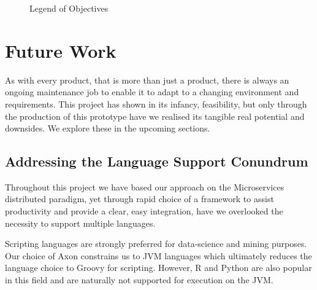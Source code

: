 \begin{figure}[h!]
	\small
	\printGoals
	\caption{Legend of Objectives}
\end{figure}





\section{Future Work}

As with every product, that is more than just a product, there is always an ongoing maintenance job to enable it to adapt to a changing environment and requirements. This project has shown in its infancy, feasibility, but only through the production of this prototype have we realised its tangible real potential and downsides. We explore these in the upcoming sections.

\subsection{Addressing the Language Support Conundrum}

Throughout this project we have based our approach on the Microservices distributed paradigm, yet through rapid choice of a framework to assist productivity and provide a clear, easy integration, have we overlooked the necessity to support multiple languages.

Scripting languages are strongly preferred for data-science and mining purposes. Our choice of Axon constrains us to JVM languages which ultimately reduces the language choice to Groovy for scripting. However, R and Python are also popular in this field and are naturally not supported for execution on the JVM. 

